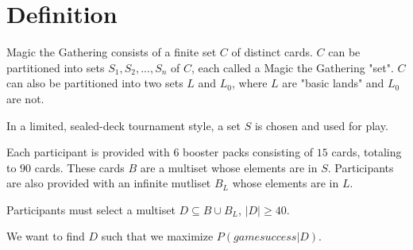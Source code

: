 \documentclass[12pt,letterpaper]{report}
\begin{document}
\section{Definition}

Magic the Gathering consists of a finite set $ C $ of distinct cards.
$ C $ can be partitioned into sets $ S_1, S_2, ..., S_n $ of $ C $, each called a Magic the Gathering "set".
$ C $ can also be partitioned into two sets $ L $ and $ L_0 $, where $ L $ are "basic lands" and $ L_0 $ are not.

In a limited, sealed-deck tournament style,
a set $ S $ is chosen and used for play.

Each participant is provided with 6 booster packs consisting of $ 15 $ cards, totaling to $ 90 $ cards.
These cards $ B $ are a multiset whose elements are in $ S $.
Participants are also provided with an infinite mutliset $ B_L $ whose elements are in $ L $.

Participants must select a multiset $ D \subseteq B \cup B_L $, $ |D| \ge 40 $.

We want to find $ D $ such that we maximize $ P(game success | D) $.
\end{document}
